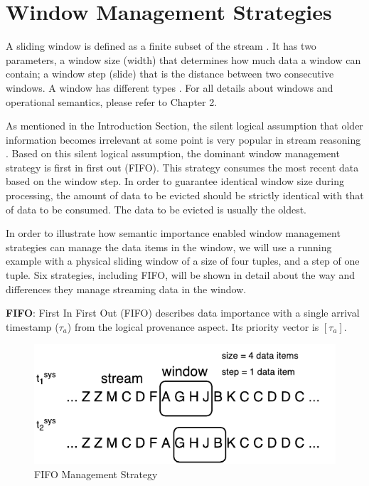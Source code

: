 \section{Window Management Strategies}
A sliding window is defined as a finite subset of the stream \cite{botan2010secret}. 
It has two parameters, a window size (width) that determines how much data a window can contain; 
a window step (slide) that is the distance between two consecutive windows. 
A window has different types \cite{barbieri2010querying} \cite{patroumpas2006window}.
For all details about windows and operational semantics, please refer to Chapter 2. 

As mentioned in the Introduction Section, the silent logical assumption that older information becomes irrelevant at some point \cite{barbieri2010stream} \cite{stuckenschmidt2010towards} is very popular in stream reasoning \cite{golab2003processing} \cite{barbieri2010deductive}.
Based on this silent logical assumption, the dominant window management strategy is first in first out (FIFO). 
This strategy consumes the most recent data based on the window step. 
In order to guarantee identical window size during processing, the amount of data to be evicted should be strictly identical with that of data to be consumed.
The data to be evicted is usually the oldest.

In order to illustrate how semantic importance enabled window management strategies can manage the data items in the window, we will use a running example with a physical sliding window of a size of four tuples, and a step of one tuple. 
Six strategies, including FIFO, will be shown in detail about the way and differences they manage streaming data in the window.

\textbf{FIFO}:
First In First Out (FIFO) describes data importance with a single arrival timestamp ($\tau_{a}$) from the logical provenance aspect. 
Its priority vector is $[\tau_{a}]$.

\begin{figure}[!htbp]
	\centering
    \includegraphics[width=5in]{img/3-sififo.pdf}
    \caption{FIFO Management Strategy}
    \label{fig:3-sififo}
\end{figure}

